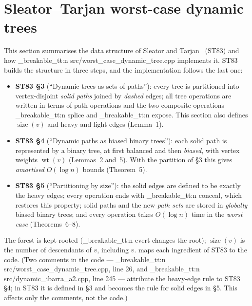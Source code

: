 \documentclass[11pt,a4paper,oneside]{report}
\theoremstyle{plain}
\theoremstyle{definition}
\theoremstyle{remark}
\DeclareRobustCommand{\code}[1]{\mtp_breakable_tt:n {#1}}
\DeclareRobustCommand{\file}[1]{\mtp_breakable_tt:n {#1}}
\newcommand{\size}{\operatorname{size}}
\newcommand{\wt}{\operatorname{wt}}
\begin{document}
\section{Sleator--Tarjan worst-case dynamic trees}\label{sec:st83}
This section summarises the data structure of Sleator and Tarjan~\cite{sleator1983} (ST83) and
how \file{src/worst_case_dynamic_tree.cpp} implements it. ST83 builds the structure in three
steps, and the implementation follows the last one:
\begin{itemize}
\item \textbf{ST83 \S3} (``Dynamic trees as sets of paths''): every tree is partitioned into
  vertex-disjoint \emph{solid paths} joined by \emph{dashed} edges; all tree operations are
  written in terms of path operations and the two composite operations \code{splice} and
  \code{expose}. This section also defines \(\size(v)\) and heavy and light edges (Lemma~1).
\item \textbf{ST83 \S4} (``Dynamic paths as biased binary trees''): each solid path is
  represented by a binary tree, at first balanced and then \emph{biased}, with vertex weights
  \(\wt(v)\) (Lemmas~2 and~5). With the partition of \S3 this gives \emph{amortised}
  \(O(\log n)\) bounds (Theorem~5).
\item \textbf{ST83 \S5} (``Partitioning by size''): the solid edges are defined to be exactly
  the heavy edges; every operation ends with \code{conceal}, which restores this property;
  solid paths and the new \emph{path sets} are stored in \emph{globally} biased binary trees;
  and every operation takes \(O(\log n)\) time in the \emph{worst case} (Theorems~6--8).
\end{itemize}
The forest is kept rooted (\code{evert} changes the root); \(\size(v)\) is the number of
descendants of \(v\), including \(v\).  maps each ingredient of ST83 to the
code. (Two comments in the code --- \file{src/worst_case_dynamic_tree.cpp}, line 26, and
\file{src/dynamic_ibarra_a2.cpp}, line 245 --- attribute the heavy-edge rule to ST83 \S4; in
ST83 it is defined in \S3 and becomes the rule for solid edges in \S5. This affects only the
comments, not the code.)
\end{document}
